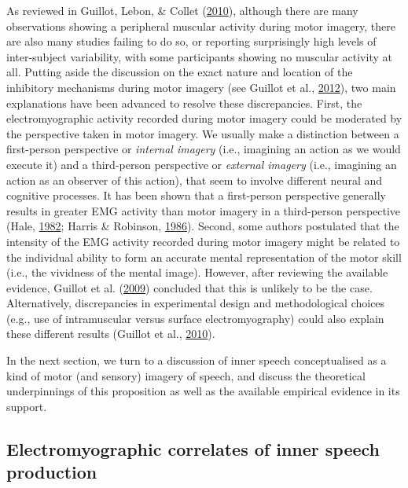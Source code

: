 \documentclass[a4paper,12pt,twoside,openright,oldfontcommands]{memoir}
\begin{document}
As reviewed in Guillot, Lebon, \& Collet
(\protect\hyperlink{ref-guillot_electromyographic_2010}{2010}), although
there are many observations showing a peripheral muscular activity
during motor imagery, there are also many studies failing to do so, or
reporting surprisingly high levels of inter-subject variability, with
some participants showing no muscular activity at all. Putting aside the
discussion on the exact nature and location of the inhibitory mechanisms
during motor imagery (see Guillot et al.,
\protect\hyperlink{ref-guillot_imagining_2012}{2012}), two main
explanations have been advanced to resolve these discrepancies. First,
the electromyographic activity recorded during motor imagery could be
moderated by the perspective taken in motor imagery. We usually make a
distinction between a first-person perspective or \emph{internal
imagery} (i.e., imagining an action as we would execute it) and a
third-person perspective or \emph{external imagery} (i.e., imagining an
action as an observer of this action), that seem to involve different
neural and cognitive processes. It has been shown that a first-person
perspective generally results in greater EMG activity than motor imagery
in a third-person perspective (Hale,
\protect\hyperlink{ref-hale_effects_1982}{1982}; Harris \& Robinson,
\protect\hyperlink{ref-harris_effects_1986}{1986}). Second, some authors
postulated that the intensity of the EMG activity recorded during motor
imagery might be related to the individual ability to form an accurate
mental representation of the motor skill (i.e., the vividness of the
mental image). However, after reviewing the available evidence, Guillot
et al. (\protect\hyperlink{ref-guillot_brain_2009}{2009}) concluded that
this is unlikely to be the case. Alternatively, discrepancies in
experimental design and methodological choices (e.g., use of
intramuscular versus surface electromyography) could also explain these
different results (Guillot et al.,
\protect\hyperlink{ref-guillot_electromyographic_2010}{2010}).

In the next section, we turn to a discussion of inner speech
conceptualised as a kind of motor (and sensory) imagery of speech, and
discuss the theoretical underpinnings of this proposition as well as the
available empirical evidence in its support.

\subsection{Electromyographic correlates of inner speech
production}\label{electromyographic-correlates-of-inner-speech-production}
\end{document}
